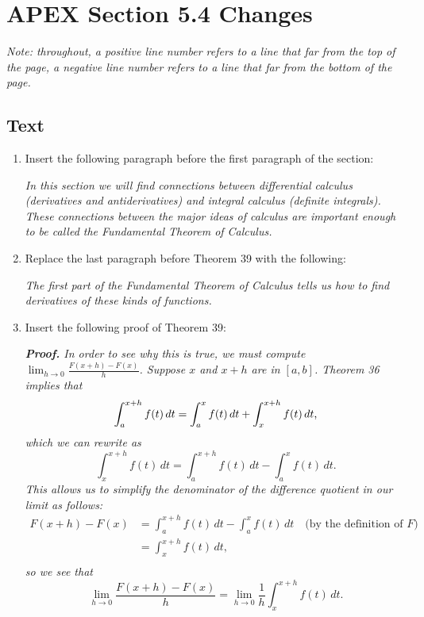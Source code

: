 \documentclass[11pt]{report}
\begin{document}
\chapter*{APEX Section 5.4 Changes}

{\slshape Note: throughout, a positive line number refers to a line that far from the top of the page, a negative line number refers to a line that far from the bottom of the page.}

\section*{Text}

\begin{enumerate}
\item Insert the following paragraph before the first paragraph of the section:

{\slshape In this section we will find connections between differential calculus (derivatives and antiderivatives) and integral calculus (definite integrals). These connections between the major ideas of calculus are important enough to be called the Fundamental Theorem of Calculus.}

\item Replace the last paragraph before Theorem 39 with the following:

{\slshape The first part of the Fundamental Theorem of Calculus tells us how to find derivatives of these kinds of functions.}

\item Insert the following proof of Theorem 39:

{\slshape {\bfseries Proof.} In order to see why this is true, we must compute $\displaystyle\lim_{h\to 0}\frac{F(x+h)-F(x)}{h}$. Suppose $x$ and $x+h$ are in $[a,b]$. Theorem 36 implies that \[\int_a^{x+h}f(t)\,dt =\int_a^x f(t)\,dt+\int_x^{x+h} f(t)\,dt\text,\] which we can rewrite as \[\int_x^{x+h} f(t)\,dt=\int_a^{x+h} f(t)\,dt-\int_a^x f(t)\,dt.\] This allows us to simplify the denominator of the difference quotient in our limit as follows:
\begin{equation*}
\begin{split}
F(x+h)-F(x) &=\int_a^{x+h} f(t)\,dt-\int_a^x f(t)\,dt \quad\text{(by the definition of $F$)}\\
&=\int_x^{x+h} f(t)\,dt\text{,}\\
\end{split}
\end{equation*}
so we see that \[\lim_{h\to 0}\frac{F(x+h)-F(x)}{h}=\lim_{h\to 0}\frac 1h\int_x^{x+h} f(t)\,dt.\]

}
\end{enumerate}
\end{document}
